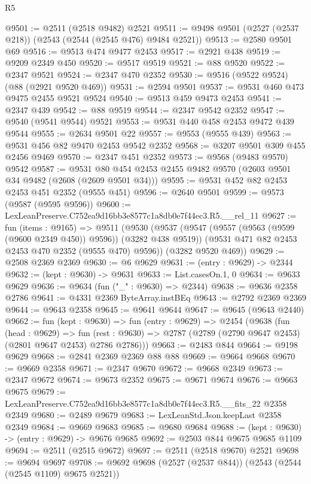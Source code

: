 \begin{lexlean}{R5}
\begin{coremodule}
@9501 := @2511 (@2518 @9482) @2521
@9511 := @9498 @9501 (@2527 (@2537 @218)) (@2543 (@2544 (@2545 @476) @9484 @2521))
@9513 := @2580 @9501 @69
@9516 := @9513 @474 @9477 @2453
@9517 := @2921 @438
@9519 := @9209 @2349 @450
@9520 := @9517 @9519
@9521 := @88 @9520
@9522 := @2347 @9521
@9524 := @2347 @470 @2352
@9530 := @9516 (@9522 @9524) (@88 (@2921 @9520 @469))
@9531 := @2594 @9501
@9537 := @9531 @460 @473 @9475 @2455 @9521 @9524
@9540 := @9513 @459 @9473 @2453
@9541 := @2347 @439
@9542 := @88 @9519
@9544 := @2347 @9542 @2352
@9547 := @9540 (@9541 @9544) @9521
@9553 := @9531 @440 @458 @2453 @9472 @439 @9544
@9555 := @2634 @9501 @22
@9557 := @9553 (@9555 @439)
@9563 := @9531 @456 @82 @9470 @2453 @9542 @2352
@9568 := @3207 @9501 @309 @455 @2456 @9469
@9570 := @2347 @451 @2352
@9573 := @9568 (@9483 @9570) @9542
@9587 := @9531 @80 @454 @2453 @2455 @9482 @9570 (@2603 @9501 @34 @9482 (@2608 (@2609 @9501 @34)))
@9595 := @9531 @452 @82 @2453 @2453 @451 @2352 (@9555 @451)
@9596 := @2640 @9501
@9599 := @9573 (@9587 (@9595 @9596))
@9600 := LexLeanPreserve.C752ea9d16bb3e8577c1a8db0e7f44ec3.R5.__rel_11
@9627 := fun (items : @9165) =>
  @9511
    (@9530
      (@9537
        (@9547 (@9557 (@9563 (@9599 (@9600 @2349 @450)) @9596)) (@3282 @438 @9519))
        (@9531 @471 @82 @2453 @2453 @470 @2352 (@9555 @470) @9596))
      (@3282 @9520 @469))
@9629 := @2508 @2369 @2369
@9630 := @6 @9629
@9631 := (entry : @9629) -> @2344
@9632 := (kept : @9630) -> @9631
@9633 := List.casesOn.{1, 0}
@9634 := @9633 @9629
@9636 := @9634 (fun ("_" : @9630) => @2344)
@9638 := @9636 @2358 @2786
@9641 := @4331 @2369 ByteArray.instBEq
@9643 := @2792 @2369 @2369
@9644 := @9643 @2358
@9645 := @9641 @9644
@9647 := @9645 (@9643 @2440)
@9662 := fun (kept : @9630) =>
  fun (entry : @9629) =>
  @2454
    (@9638
      (fun (head : @9629) =>
      fun (rest : @9630) => @2787 (@2789 (@2790 @9647 @2453) (@2801 @9647 @2453) @2786 @2786)))
@9663 := @2483 @844
@9664 := @9198 @9629
@9668 := @2841 @2369 @2369 @88 @88
@9669 := @9664 @9668
@9670 := @9669 @2358
@9671 := @2347 @9670
@9672 := @9668 @2349
@9673 := @2347 @9672
@9674 := @9673 @2352
@9675 := @9671 @9674
@9676 := @9663 @9675
@9679 := LexLeanPreserve.C752ea9d16bb3e8577c1a8db0e7f44ec3.R5.__fits_22 @2358 @2349
@9680 := @2489 @9679
@9683 := LexLeanStd.Json.keepLast @2358 @2349
@9684 := @9669 @9683
@9685 := @9680 @9684
@9688 := (kept : @9630) -> (entry : @9629) -> @9676 @9685
@9692 := @2503 @844 @9675 @9685 @1109
@9694 := @2511 (@2515 @9672)
@9697 := @2511 (@2518 @9670) @2521
@9698 := @9694 @9697
@9708 := @9692 @9698 (@2527 (@2537 @844)) (@2543 (@2544 (@2545 @1109) @9675 @2521))

\end{coremodule}
\end{lexlean}
